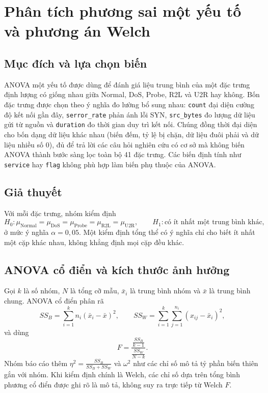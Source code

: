 \section{\texorpdfstring{\hspace{0.2em}}{}Phân tích phương sai một yếu tố và phương án Welch}
\label{sec:phuongphap-anova}

\subsection{Mục đích và lựa chọn biến}
ANOVA một yếu tố được dùng để đánh giá liệu trung bình của một đặc trưng định lượng có
giống nhau giữa Normal, DoS, Probe, R2L và U2R hay không. Bốn đặc trưng được chọn theo
ý nghĩa đo lường bổ sung nhau: \texttt{count} đại diện cường độ kết nối gần đây,
\texttt{serror\_rate} phản ánh lỗi SYN, \texttt{src\_bytes} đo lượng dữ liệu gửi từ
nguồn và \texttt{duration} đo thời gian duy trì kết nối. Chúng đồng thời đại diện cho
bốn dạng dữ liệu khác nhau (biến đếm, tỷ lệ bị chặn, dữ liệu đuôi phải và dữ liệu nhiều
số 0), đủ để trả lời các câu hỏi nghiên cứu có cơ sở mà không biến ANOVA thành bước sàng
lọc toàn bộ 41 đặc trưng. Các biến định tính như \texttt{service} hay \texttt{flag}
không phù hợp làm biến phụ thuộc của ANOVA.

\subsection{Giả thuyết}
Với mỗi đặc trưng, nhóm kiểm định
\[
H_0:\mu_{\mathrm{Normal}}=\mu_{\mathrm{DoS}}=\mu_{\mathrm{Probe}}
=\mu_{\mathrm{R2L}}=\mu_{\mathrm{U2R}},
\qquad
H_1:\text{có ít nhất một trung bình khác},
\]
ở mức ý nghĩa $\alpha=0{,}05$. Một kiểm định tổng thể có ý nghĩa chỉ cho biết ít nhất
một cặp khác nhau, không khẳng định mọi cặp đều khác.

\subsection{ANOVA cổ điển và kích thước ảnh hưởng}
Gọi $k$ là số nhóm, $N$ là tổng cỡ mẫu, $\bar x_i$ là trung bình nhóm và $\bar x$ là
trung bình chung. ANOVA cổ điển phân rã
\[
SS_B=\sum_{i=1}^{k}n_i(\bar x_i-\bar x)^2,\qquad
SS_W=\sum_{i=1}^{k}\sum_{j=1}^{n_i}(x_{ij}-\bar x_i)^2,
\]
và dùng
\[
F=\frac{\frac{SS_B}{k-1}}{\frac{SS_W}{N-k}}.
\]
Nhóm báo cáo thêm $\eta^2=\frac{SS_B}{SS_B+SS_W}$ và $\omega^2$ như các chỉ số mô
tả tỷ phần biến thiên gắn với nhóm. Khi kiểm định chính là Welch, các chỉ số dựa trên
tổng bình phương cổ điển được ghi rõ là mô tả, không suy ra trực tiếp từ Welch $F$.

